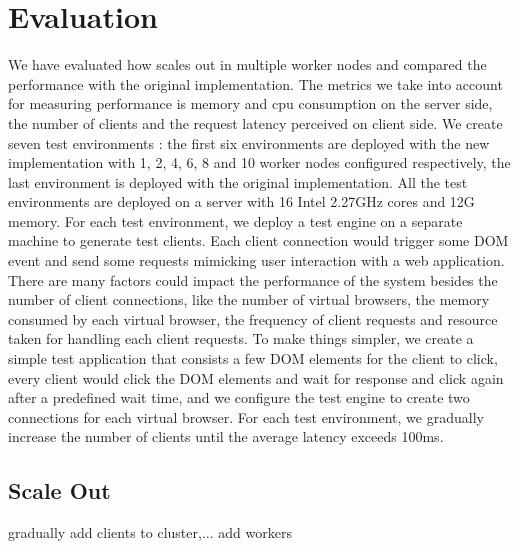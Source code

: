 \section{Evaluation}
\label{sec:eval}
We have evaluated how \cb{} scales out in multiple worker nodes and compared the performance
with the original implementation.
The metrics we take into account for measuring performance is memory and cpu consumption on the server side, 
the number of clients
and the request latency perceived on client side.
We create seven test environments : 
the first six environments are deployed with the new implementation with 1, 2, 4, 6, 8 and 10 worker nodes 
configured respectively, 
the last environment is deployed with the original implementation.
All the test environments are deployed on a server with 16 Intel 2.27GHz cores and 12G memory.
For each test environment, 
we deploy a test engine on a separate machine to generate test clients.
Each client connection would trigger some DOM event and send some requests mimicking user interaction with a web application.
There are many factors could impact the performance of the system besides the number of client connections,
like the number of virtual browsers, the memory consumed by each virtual browser, 
the frequency of client requests
and resource taken for handling each client requests.
To make things simpler, we create a simple test application that consists a few DOM elements for the client to click,
every client would click the DOM elements and wait for response and click again after a predefined wait time,
and we configure the test engine to create two connections for each virtual browser.
For each test environment, 
we gradually increase the number of clients until the average latency exceeds 100ms.



\subsection{Scale Out}
gradually add clients to cluster,... add workers

\subsection{}